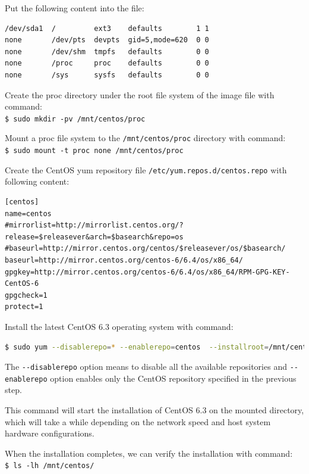 Put the following content into the file:
\lstset{style=bashstyle}
\begin{lstlisting}
/dev/sda1  /         ext3    defaults        1 1
none       /dev/pts  devpts  gid=5,mode=620  0 0
none       /dev/shm  tmpfs   defaults        0 0
none       /proc     proc    defaults        0 0
none       /sys      sysfs   defaults        0 0
\end{lstlisting}

Create the proc directory under the root file system of the image file with command: \\
\verb|$ sudo mkdir -pv /mnt/centos/proc|

Mount a proc file system to the \verb|/mnt/centos/proc| directory with command: \\
\verb|$ sudo mount -t proc none /mnt/centos/proc|

Create the CentOS yum repository file \verb|/etc/yum.repos.d/centos.repo| with following content:
\lstset{style=bashstyle}
\begin{lstlisting}
[centos]
name=centos
#mirrorlist=http://mirrorlist.centos.org/?release=$releasever&arch=$basearch&repo=os
#baseurl=http://mirror.centos.org/centos/$releasever/os/$basearch/
baseurl=http://mirror.centos.org/centos-6/6.4/os/x86_64/
gpgkey=http://mirror.centos.org/centos-6/6.4/os/x86_64/RPM-GPG-KEY-CentOS-6
gpgcheck=1
protect=1
\end{lstlisting}

Install the latest CentOS 6.3 operating system with command:
\lstset{style=bashstyle}
\begin{lstlisting}[language=bash]
$ sudo yum --disablerepo=* --enablerepo=centos  --installroot=/mnt/centos -y groupinstall Base
\end{lstlisting}

The \verb|--disablerepo| option means to disable all the available repositories and \verb|--enablerepo| option enables only the CentOS repository specified in the previous step.

This command will start the installation of CentOS 6.3 on the mounted directory, which will take a while depending on the network speed and host system hardware configurations.

When the installation completes, we can verify the installation with command:\\
\verb|$ ls -lh /mnt/centos/|

